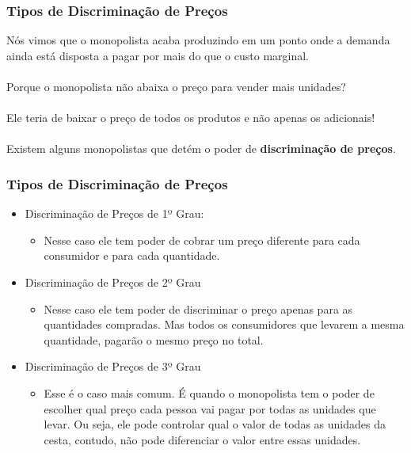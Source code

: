 \documentclass{beamer}[10]
\begin{document}

\begin{frame}
	\frametitle{Tipos de Discriminação de Preços}

	Nós vimos que o monopolista acaba produzindo em um ponto onde a demanda ainda está disposta a pagar por mais do que o custo marginal.
	\\~\\
	Porque o monopolista não abaixa o preço para vender mais unidades?
	\\~\\
	Ele teria de baixar o preço de todos os produtos e não apenas os adicionais!
	\\~\\
	Existem alguns monopolistas que detém o poder de \textbf{discriminação de preços}.

\end{frame}

\begin{frame}
	\frametitle{Tipos de Discriminação de Preços}

	\begin{itemize}
		\item Discriminação de Preços de 1º Grau:
			\begin{itemize}
			\item[] Nesse caso ele tem poder de cobrar um preço diferente para cada consumidor e para cada quantidade.
			\end{itemize}
		\item Discriminação de Preços de 2º Grau
			\begin{itemize}
			\item[] Nesse caso ele tem poder de discriminar o preço apenas para as quantidades compradas. Mas todos os consumidores que levarem a mesma quantidade, pagarão o mesmo preço no total.
			\end{itemize}
		\item Discriminação de Preços de 3º Grau
			\begin{itemize}
			\item[] Esse é o caso mais comum. É quando o monopolista tem o poder de escolher qual preço cada pessoa vai pagar por todas as unidades que levar. Ou seja, ele pode controlar qual o valor de todas as unidades da cesta, contudo, não pode diferenciar o valor entre essas unidades.
			\end{itemize}
		\end{itemize}

\end{frame}
\end{document}
